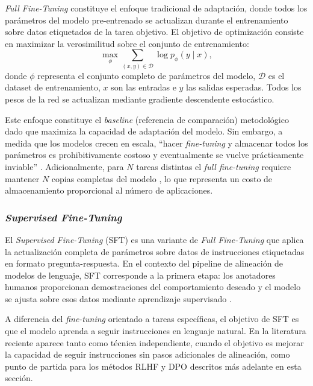 \textit{Full Fine-Tuning} constituye el enfoque tradicional de adaptación, donde todos los parámetros del modelo pre-entrenado se actualizan durante el entrenamiento sobre datos etiquetados de la tarea objetivo. El objetivo de optimización consiste en maximizar la verosimilitud sobre el conjunto de entrenamiento:
\begin{equation}
\max_{\phi} \sum_{(x,y) \in \mathcal{D}} \log p_\phi(y \mid x),
\end{equation}
donde $\phi$ representa el conjunto completo de parámetros del modelo, $\mathcal{D}$ es el dataset de entrenamiento, $x$ son las entradas e $y$ las salidas esperadas. Todos los pesos de la red se actualizan mediante gradiente descendente estocástico.

Este enfoque constituye el \textit{baseline} (referencia de comparación) metodológico dado que maximiza la capacidad de adaptación del modelo. Sin embargo, a medida que los modelos crecen en escala, ``hacer \textit{fine-tuning} y almacenar todos los parámetros es prohibitivamente costoso y eventualmente se vuelve prácticamente inviable'' \parencite[p.~220]{Ding2023}. Adicionalmente, para $N$ tareas distintas el \textit{full fine-tuning} requiere mantener $N$ copias completas del modelo \parencite[p.~4]{houlsby2019parameterefficienttransferlearningnlp}, lo que representa un costo de almacenamiento proporcional al número de aplicaciones.

\subsubsection{\textit{Supervised Fine-Tuning}}

El \textit{Supervised Fine-Tuning} (SFT) es una variante de \textit{Full Fine-Tuning} que aplica la actualización completa de parámetros sobre datos de instrucciones etiquetadas en formato pregunta-respuesta. En el contexto del pipeline de alineación de modelos de lenguaje, SFT corresponde a la primera etapa: los anotadores humanos proporcionan demostraciones del comportamiento deseado y el modelo se ajusta sobre esos datos mediante aprendizaje supervisado \parencite[p.~6]{ouyang2022traininglanguagemodelsfollow}.

A diferencia del \textit{fine-tuning} orientado a tareas específicas, el objetivo de SFT es que el modelo aprenda a seguir instrucciones en lenguaje natural. En la literatura reciente aparece tanto como técnica independiente, cuando el objetivo es mejorar la capacidad de seguir instrucciones sin pasos adicionales de alineación, como punto de partida para los métodos RLHF y DPO descritos más adelante en esta sección.


